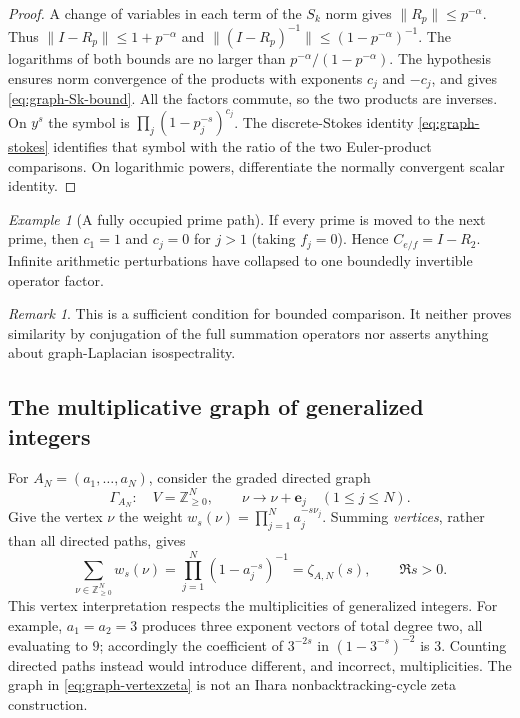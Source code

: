 \documentclass[12pt,letterpaper]{article}
\theoremstyle{definition}
\theoremstyle{remark}
\newtheorem{remark}[theorem]{Remark}
\newtheorem{example}[theorem]{Example}
\begin{document}
\begin{proof}
A change of variables in each term of the $S_k$ norm gives
$\|R_p\|\le p^{-\alpha}$. Thus
$\|I-R_p\|\le1+p^{-\alpha}$ and
$\|(I-R_p)^{-1}\|\le(1-p^{-\alpha})^{-1}$.
The logarithms of both bounds are no larger than
$p^{-\alpha}/(1-p^{-\alpha})$.
The hypothesis ensures norm convergence of the products
with exponents $c_j$ and $-c_j$, and gives
\eqref{eq:graph-Sk-bound}. All the factors commute, so the
two products are inverses.
On $y^s$ the symbol is
$\prod_j(1-p_j^{-s})^{c_j}$.
The discrete-Stokes identity \eqref{eq:graph-stokes}
identifies that symbol with the ratio of the two
Euler-product comparisons. On logarithmic powers,
differentiate the normally convergent scalar identity.
\end{proof}

\begin{example}[A fully occupied prime path]
If every prime is moved to the next prime, then
$c_1=1$ and $c_j=0$ for $j>1$ (taking $f_j=0$).
Hence $C_{e/f}=I-R_2$. Infinite arithmetic
perturbations have collapsed to one boundedly invertible
operator factor.
\end{example}

\begin{remark}
This is a sufficient condition for bounded comparison.
It neither proves similarity by conjugation of the full
summation operators nor asserts anything about graph-Laplacian
isospectrality.
\end{remark}

\subsection{The multiplicative graph of generalized integers}

For \(A_N=(a_1,\ldots,a_N)\), consider the graded directed graph
\[
 \Gamma_{A_N}:\quad
 V=\mathbb Z_{\ge0}^{N},\qquad
 \nu\longrightarrow \nu+\mathbf e_j\quad(1\le j\le N).
\]
Give the vertex \(\nu\) the weight
\(w_s(\nu)=\prod_{j=1}^N a_j^{-s\nu_j}\).
Summing \emph{vertices}, rather than all directed paths, gives
\begin{equation}\label{eq:graph-vertexzeta}
 \sum_{\nu\in\mathbb Z_{\ge0}^N}w_s(\nu)
 =\prod_{j=1}^N(1-a_j^{-s})^{-1}
 =\zeta_{A,N}(s),\qquad\Re s>0.
\end{equation}
This vertex interpretation respects the multiplicities of
generalized integers.  For example, \(a_1=a_2=3\) produces
three exponent vectors of total degree two, all evaluating to \(9\);
accordingly the coefficient of \(3^{-2s}\) in
\((1-3^{-s})^{-2}\) is \(3\).  Counting directed paths instead
would introduce different, and incorrect, multiplicities.
The graph in \eqref{eq:graph-vertexzeta} is not an Ihara
nonbacktracking-cycle zeta construction.
\end{document}

